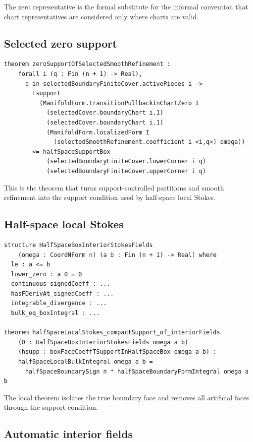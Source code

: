 The zero representative is the formal substitute for the informal convention
that chart representatives are considered only where charts are valid.

\subsection{Selected zero support}

\begin{lstlisting}[language=Lean,basicstyle=\ttfamily\scriptsize]
theorem zeroSupportOfSelectedSmoothRefinement :
    forall i (q : Fin (n + 1) -> Real),
      q in selectedBoundaryFiniteCover.activePieces i ->
        tsupport
          (ManifoldForm.transitionPullbackInChartZero I
            (selectedCover.boundaryChart i.1)
            (selectedCover.boundaryChart i.1)
            (ManifoldForm.localizedForm I
              (selectedSmoothRefinement.coefficient i <i,q>) omega))
        <= halfSpaceSupportBox
            (selectedBoundaryFiniteCover.lowerCorner i q)
            (selectedBoundaryFiniteCover.upperCorner i q)
\end{lstlisting}

This is the theorem that turns support-controlled partitions and smooth
refinement into the support condition used by half-space local Stokes.

\subsection{Half-space local Stokes}

\begin{lstlisting}[language=Lean,basicstyle=\ttfamily\footnotesize]
structure HalfSpaceBoxInteriorStokesFields
    (omega : CoordNForm n) (a b : Fin (n + 1) -> Real) where
  le : a <= b
  lower_zero : a 0 = 0
  continuous_signedCoeff : ...
  hasFDerivAt_signedCoeff : ...
  integrable_divergence : ...
  bulk_eq_boxIntegral : ...

theorem halfSpaceLocalStokes_compactSupport_of_interiorFields
    (D : HalfSpaceBoxInteriorStokesFields omega a b)
    (hsupp : boxFaceCoeffTSupportInHalfSpaceBox omega a b) :
    halfSpaceLocalBulkIntegral omega a b =
      halfSpaceBoundarySign n * halfSpaceBoundaryFormIntegral omega a b
\end{lstlisting}

The local theorem isolates the true boundary face and removes all artificial
faces through the support condition.

\subsection{Automatic interior fields}

